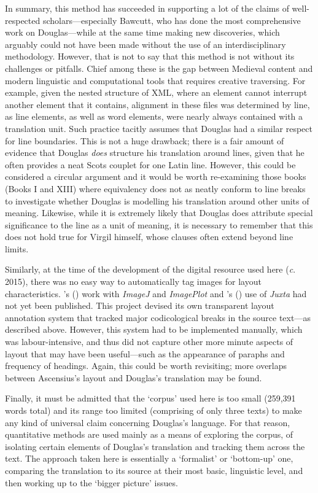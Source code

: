 \documentclass{dhbenelux}
\begin{document}
In summary, this method has succeeded in supporting a lot of the claims
of well-respected scholars---especially Bawcutt, who has done the most
comprehensive work on Douglas---while at the same time making new
discoveries, which arguably could not have been made without the use of
an interdisciplinary methodology. However, that is not to say that this
method is not without its challenges or pitfalls. Chief among these is
the gap between Medieval content and modern linguistic and computational
tools that requires creative traversing. For example, given the nested
structure of XML, where an element cannot interrupt another element that
it contains, alignment in these files was determined by line, as line
elements, as well as word elements, were nearly always contained with a
translation unit. Such practice tacitly assumes that Douglas had a
similar respect for line boundaries. This is not a huge drawback; there
is a fair amount of evidence that Douglas \emph{does} structure his
translation around lines, given that he often provides a neat Scots
couplet for one Latin line. However, this could be considered a circular
argument and it would be worth re-examining those books (Books I and
XIII) where equivalency does not as neatly conform to line breaks to
investigate whether Douglas is modelling his translation around other
units of meaning. Likewise, while it is extremely likely that Douglas
does attribute special significance to the line as a unit of meaning, it
is necessary to remember that this does not hold true for Virgil
himself, whose clauses often extend beyond line limits.

Similarly, at the time of the development of the digital resource used
here (\emph{c}. 2015), there was no easy way to automatically tag images
for layout characteristics. \citeauthor{tyrkko2017}'s (\citeyear{tyrkko2017}) work with \emph{ImageJ} and
\emph{ImagePlot} and \citeauthor{varila2016}'s (\citeyear{varila2016}) use of \emph{Juxta} had not yet
been published. This project devised its own transparent layout
annotation system that tracked major codicological breaks in the source
text---as described above. However, this system had to be implemented
manually, which was labour-intensive, and thus did not capture other
more minute aspects of layout that may have been useful---such as the
appearance of paraphs and frequency of headings. Again, this could be
worth revisiting; more overlaps between Ascensius's layout and Douglas's
translation may be found.

Finally, it must be admitted that the `corpus' used here is too small
(259,391 words total) and its range too limited (comprising of only
three texts) to make any kind of universal claim concerning Douglas's
language. For that reason, quantitative methods are used mainly as a
means of exploring the corpus, of isolating certain elements of
Douglas's translation and tracking them across the text. The approach
taken here is essentially a `formalist' or `bottom-up' one, comparing
the translation to its source at their most basic, linguistic level, and
then working up to the `bigger picture' issues.
\end{document}
